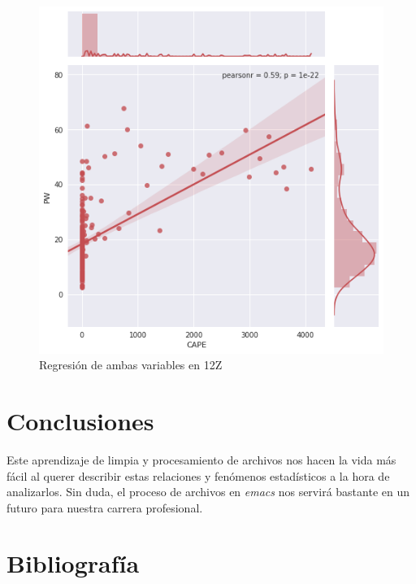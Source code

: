 \documentclass{article}
\begin{document}
\begin{figure}[H]
\includegraphics[width=\linewidth]{CAPEvPW_Red12Z.png}
\caption{Regresión de ambas variables en 12Z}
\end{figure}

\section{Conclusiones}
Este aprendizaje de limpia y procesamiento de archivos nos hacen la vida más fácil al querer describir estas relaciones y fenómenos estadísticos a la hora de analizarlos. 
Sin duda, el proceso de archivos en \textit{emacs} nos servirá bastante en un futuro para nuestra carrera profesional.

\newpage

\section{Bibliografía}
\end{document}
